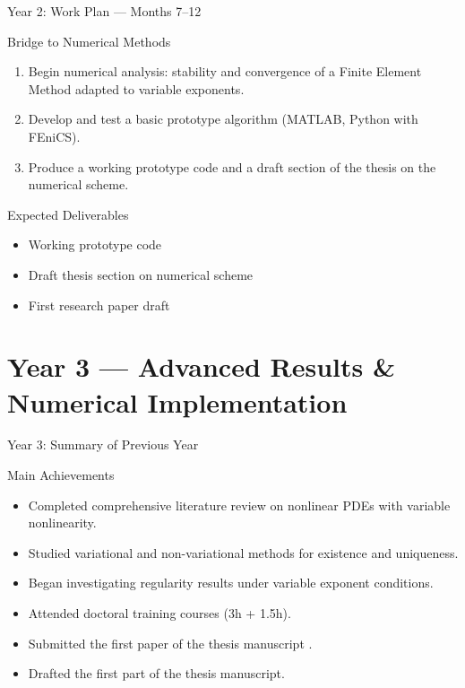 \documentclass[11pt]{beamer}
\let\oldcite\cite
\renewcommand{\cite}[1]{\textcolor{red}{\textbf{\oldcite{#1}}}}
\begin{document}
	\begin{frame}{Year 2: Work Plan — Months 7--12}
		\begin{block}{Bridge to Numerical Methods}
			\begin{enumerate}
				\item Begin numerical analysis: stability and convergence of a Finite Element Method adapted to variable exponents.
				\item Develop and test a basic prototype algorithm (MATLAB, Python with FEniCS).
				\item Produce a working prototype code and a draft section of the thesis on the numerical scheme.
			\end{enumerate}
		\end{block}
		
		\begin{exampleblock}{Expected Deliverables}
			\begin{itemize}
				\item Working prototype code
				\item Draft thesis section on numerical scheme
				\item First research paper draft
			\end{itemize}
		\end{exampleblock}
	\end{frame}
	
	\section{Year 3 — Advanced Results \& Numerical Implementation}
	
	\begin{frame}{Year 3: Summary of Previous Year}
		\begin{block}{Main Achievements}
			\begin{itemize}
				\item Completed comprehensive literature review on nonlinear PDEs with variable nonlinearity.
				\item Studied variational and non-variational methods for existence and uniqueness.
				\item Began investigating regularity results under variable exponent conditions.
				\item Attended doctoral training courses (3h + 1.5h).
				\item Submitted the first paper of the thesis manuscript \cite{BrahimiHellal2026}.
				\item Drafted the first part of the thesis manuscript.
			\end{itemize}
		\end{block}
	\end{frame}
	
\end{document}
